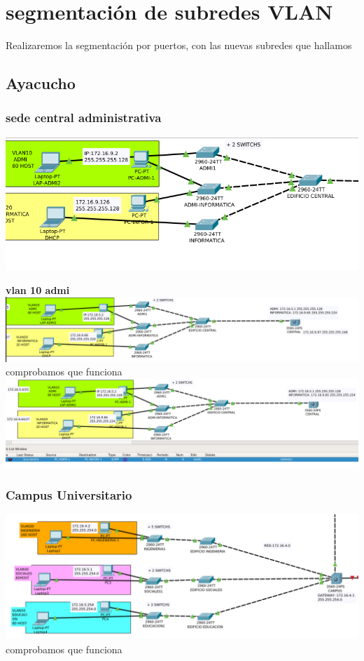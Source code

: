\section{segmentaci\'on de subredes VLAN}

Realizaremos la segmentaci\'on por puertos, con las nuevas subredes que hallamos\\
\subsection{Ayacucho}

\subsubsection{sede central administrativa}
\includegraphics[scale=0.52]{img/vlancentral.png} 

\textbf{vlan 10 admi}\\
\includegraphics[scale=0.35]{img/VLAN10AYACUCHO.png} 
\\comprobamos que funciona\\
\includegraphics[scale=0.35]{img/vlan100sucess.png} 
 
 \subsubsection{Campus Universitario}
\includegraphics[scale=0.35]{img/VLANCAMPUS.png} 
\\comprobamos que funciona\\

